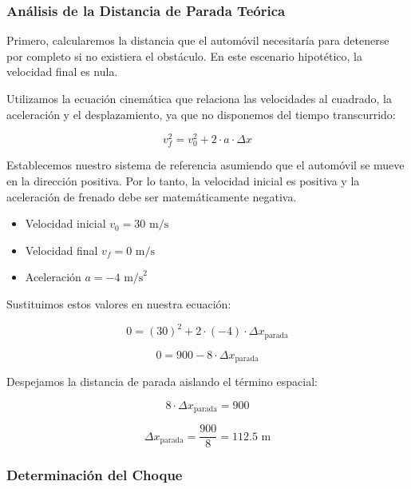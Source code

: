\documentclass[12pt, a4paper]{article}
\begin{document}
\subsubsection*{Análisis de la Distancia de Parada Teórica}

Primero, calcularemos la distancia que el automóvil necesitaría para detenerse por completo si no existiera el obstáculo. En este escenario hipotético, la velocidad final es nula. 

Utilizamos la ecuación cinemática que relaciona las velocidades al cuadrado, la aceleración y el desplazamiento, ya que no disponemos del tiempo transcurrido:

\begin{equation}
v_f^2 = v_0^2 + 2 \cdot a \cdot \Delta x
\end{equation}

Establecemos nuestro sistema de referencia asumiendo que el automóvil se mueve en la dirección positiva. Por lo tanto, la velocidad inicial es positiva y la aceleración de frenado debe ser matemáticamente negativa.

\begin{itemize}
    \item Velocidad inicial $v_0 = 30 \text{ m/s}$
    \item Velocidad final $v_f = 0 \text{ m/s}$
    \item Aceleración $a = -4 \text{ m/s}^2$
\end{itemize}

Sustituimos estos valores en nuestra ecuación:

\begin{equation}
0 = (30)^2 + 2 \cdot (-4) \cdot \Delta x_{\text{parada}}
\end{equation}

\begin{equation}
0 = 900 - 8 \cdot \Delta x_{\text{parada}}
\end{equation}

Despejamos la distancia de parada aislando el término espacial:

\begin{equation}
8 \cdot \Delta x_{\text{parada}} = 900
\end{equation}

\begin{equation}
\Delta x_{\text{parada}} = \frac{900}{8} = 112.5 \text{ m}
\end{equation}

\subsubsection*{Determinación del Choque}
\end{document}
